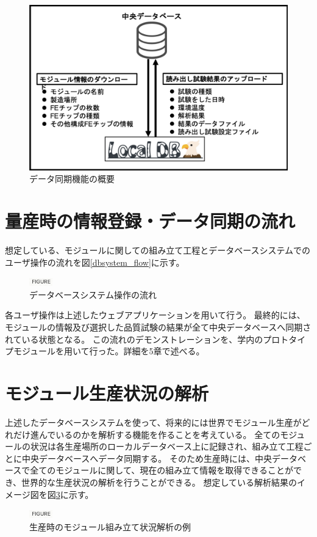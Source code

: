 \begin{figure}[bpt]\centering
\includegraphics[width=12cm]{interface_overview}
\caption[データ同期機能の概要]{データ同期機能の概要}
\label{interface_overview}
\end{figure}

\newpage
\section{量産時の情報登録・データ同期の流れ}
想定している、モジュールに関しての組み立て工程とデータベースシステムでのユーザ操作の流れを図\ref{dbsystem_flow}に示す。

\begin{figure}[bpt]\centering
\includegraphics[width=1cm]{figure}
\caption[データベースシステム操作の流れ]{データベースシステム操作の流れ}
\label{webapp_sign_off}
\end{figure}

各ユーザ操作は上述したウェブアプリケーションを用いて行う。
最終的には、モジュールの情報及び選択した品質試験の結果が全て中央データベースへ同期されている状態となる。
この流れのデモンストレーションを、学内のプロトタイプモジュールを用いて行った。詳細を5章で述べる。

\section{モジュール生産状況の解析}
上述したデータベースシステムを使って、将来的には世界でモジュール生産がどれだけ進んでいるのかを解析する機能を作ることを考えている。
全てのモジュールの状況は各生産場所のローカルデータベース上に記録され、組み立て工程ごとに中央データベースへデータ同期する。
そのため生産時には、中央データベースで全てのモジュールに関して、現在の組み立て情報を取得できることができ、世界的な生産状況の解析を行うことができる。
想定している解析結果のイメージ図を図\ref{production_analysis}に示す。

\begin{figure}[bpt]\centering
\includegraphics[width=1cm]{figure}
\caption[生産時のモジュール組み立て状況解析の例]{生産時のモジュール組み立て状況解析の例}
\label{production_analysis}
\end{figure}

